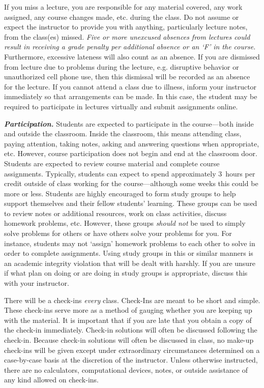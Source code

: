 \documentclass[11pt,letterpaper]{article}
\begin{document}
If you miss a lecture, you are responsible for any material covered, any work assigned, any course changes made, etc. during the class. Do not assume or expect the instructor to provide you with anything, particularly lecture notes, from the class(es) missed. {\itshape Five or more unexcused absences from lectures could result in receiving a grade penalty per additional absence or an `F' in the course.} Furthermore, excessive lateness will also count as an absence. If you are dismissed from lecture due to problems during the lecture, e.g. disruptive behavior or unauthorized cell phone use, then this dismissal will be recorded as an absence for the lecture. If you cannot attend a class due to illness, inform your instructor immediately so that arrangements can be made. In this case, the student may be required to participate in lectures virtually and submit assignments online. \pspace

{\itshape\bfseries\color{scred}Participation.} 
Students are expected to participate in the course---both inside and outside the classroom. Inside the classroom, this means attending class, paying attention, taking notes, asking and answering questions when appropriate, etc. However, course participation does not begin and end at the classroom door. Students are expected to review course material and complete course assignments. Typically, students can expect to spend approximately 3~hours per credit outside of class working for the course---although some weeks this could be more or less. Students are highly encouraged to form study groups to help support themselves and their fellow students' learning. These groups can be used to review notes or additional resources, work on class activities, discuss homework problems, etc. However, these groups {\itshape should not} be used to simply solve problems for others or have others solve your problems for you. For instance, students may not `assign' homework problems to each other to solve in order to complete assignments. Using study groups in this or similar manners is an academic integrity violation that will be dealt with harshly. If you are unsure if what plan on doing or are doing in study groups is appropriate, discuss this with your instructor. \par\vspace{0.8cm}




There will be a check-ins \textit{every} class. Check-Ins are meant to be short and simple. These check-ins serve more as a method of gauging whether you are keeping up with the material. It is important that if you are late that you obtain a copy of the check-in immediately. Check-in solutions will often be discussed following the check-in. Because check-in solutions will often be discussed in class, no make-up check-ins will be given except under extraordinary circumstances determined on a case-by-case basis at the discretion of the instructor. Unless otherwise instructed, there are no calculators, computational devices, notes, or outside assistance of any kind allowed on check-ins. 
\sectionbreak
\end{document}
